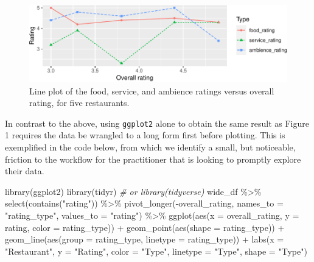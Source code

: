 \documentclass[10pt,a4paper,onecolumn]{article}
\newenvironment{Shaded}{\begin{snugshade}}{\end{snugshade}}
\newcommand{\AttributeTok}[1]{\textcolor[rgb]{0.77,0.63,0.00}{#1}}
\newcommand{\CommentTok}[1]{\textcolor[rgb]{0.56,0.35,0.01}{\textit{#1}}}
\newcommand{\FunctionTok}[1]{\textcolor[rgb]{0.00,0.00,0.00}{#1}}
\newcommand{\NormalTok}[1]{#1}
\newcommand{\SpecialCharTok}[1]{\textcolor[rgb]{0.00,0.00,0.00}{#1}}
\newcommand{\StringTok}[1]{\textcolor[rgb]{0.31,0.60,0.02}{#1}}
\begin{document}
\begin{figure}
\centering
\includegraphics{paper_files/figure-latex/matplot2-1.pdf}
\caption{Line plot of the food, service, and ambience ratings versus
overall rating, for five restaurants.}
\end{figure}

In contrast to the above, using \texttt{ggplot2} alone to obtain the
same result as Figure 1 requires the data be wrangled to a long form
first before plotting. This is exemplified in the code below, from which
we identify a small, but noticeable, friction to the workflow for the
practitioner that is looking to promptly explore their data.

\begin{Shaded}
\begin{Highlighting}[]
\FunctionTok{library}\NormalTok{(ggplot2)}
\FunctionTok{library}\NormalTok{(tidyr) }\CommentTok{\# or library(tidyverse)}
\NormalTok{wide\_df }\SpecialCharTok{\%\textgreater{}\%} 
  \FunctionTok{select}\NormalTok{(}\FunctionTok{contains}\NormalTok{(}\StringTok{"rating"}\NormalTok{)) }\SpecialCharTok{\%\textgreater{}\%} 
  \FunctionTok{pivot\_longer}\NormalTok{(}\SpecialCharTok{{-}}\NormalTok{overall\_rating, }
               \AttributeTok{names\_to =} \StringTok{"rating\_type"}\NormalTok{,}
               \AttributeTok{values\_to =} \StringTok{"rating"}\NormalTok{) }\SpecialCharTok{\%\textgreater{}\%} 
  \FunctionTok{ggplot}\NormalTok{(}\FunctionTok{aes}\NormalTok{(}\AttributeTok{x =}\NormalTok{ overall\_rating, }\AttributeTok{y =}\NormalTok{ rating, }\AttributeTok{color =}\NormalTok{ rating\_type)) }\SpecialCharTok{+} 
  \FunctionTok{geom\_point}\NormalTok{(}\FunctionTok{aes}\NormalTok{(}\AttributeTok{shape =}\NormalTok{ rating\_type)) }\SpecialCharTok{+}
  \FunctionTok{geom\_line}\NormalTok{(}\FunctionTok{aes}\NormalTok{(}\AttributeTok{group =}\NormalTok{ rating\_type, }\AttributeTok{linetype =}\NormalTok{ rating\_type)) }\SpecialCharTok{+}
  \FunctionTok{labs}\NormalTok{(}\AttributeTok{x =} \StringTok{"Restaurant"}\NormalTok{, }\AttributeTok{y =} \StringTok{"Rating"}\NormalTok{, }
       \AttributeTok{color =} \StringTok{"Type"}\NormalTok{, }\AttributeTok{linetype =} \StringTok{"Type"}\NormalTok{, }\AttributeTok{shape =} \StringTok{"Type"}\NormalTok{)}
\end{Highlighting}
\end{Shaded}
\end{document}
